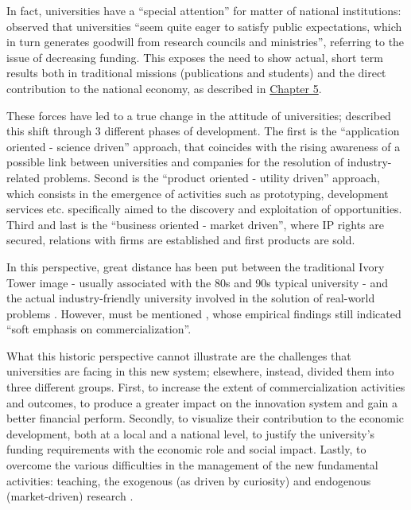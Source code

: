 In fact, universities have a \enquote{special attention} for matter of national institutions: \citet{Rasmussen2006} observed that universities \enquote{seem quite eager to satisfy public expectations, which in turn generates goodwill from research councils and ministries}, referring to the issue of decreasing funding. This exposes the need to show actual, short term results both in traditional missions (publications and students) and the direct contribution to the national economy, as described in \hyperref[Chapter5]{Chapter 5}.

These forces have led to a true change in the attitude of universities; \citet{Tijssen2006} described this shift through 3 different phases of development. The first is the \enquote{application oriented - science driven} approach, that coincides with the rising awareness of a possible link between universities and companies for the resolution of industry-related problems. Second is the \enquote{product oriented - utility driven} approach, which consists in the emergence of activities such as prototyping, development services etc. specifically aimed to the discovery and exploitation of opportunities. Third and last is the \enquote{business oriented - market driven}, where IP rights are secured, relations with firms are established and first products are sold.

In this perspective, great distance has been put between the traditional Ivory Tower image - usually associated with the 80s and 90s typical university - and the actual industry-friendly university involved in the solution of real-world problems \citep{Baldini2006}. However, must be mentioned \citet{Rasmussen2006}, whose empirical findings still indicated \enquote{soft emphasis on commercialization}.

What this historic perspective cannot illustrate are the challenges that universities are facing in this new system; elsewhere, instead, \citet{Rasmussen2006} divided them into three different groups. First, to increase the extent of commercialization activities and outcomes, to produce a greater impact on the innovation system and gain a better financial perform. Secondly, to visualize their contribution to the economic development, both at a local and a national level, to justify the university's funding requirements with the economic role and social impact. Lastly, to overcome the various difficulties in the management of the new fundamental activities: teaching, the exogenous (as driven by curiosity) and endogenous (market-driven) research \citep{Debackere2005}. 

